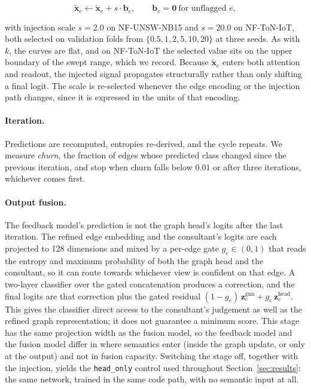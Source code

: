 \begin{equation}
\label{eq:feedback-injection}
\tilde{\mathbf{x}}_{e} \leftarrow \tilde{\mathbf{x}}_{e} + s \cdot \mathbf{b}_{e},
\qquad
\mathbf{b}_{e} = \mathbf{0} \ \text{for unflagged } e ,
\end{equation}

with injection scale $s = 2.0$ on NF-UNSW-NB15 and $s = 20.0$ on NF-ToN-IoT, both selected on
validation folds from $\{0.5, 1, 2, 5, 10, 20\}$ at three seeds. As with $k$, the curves are
flat, and on NF-ToN-IoT the selected value sits on the upper boundary of the swept range,
which we record. Because $\tilde{\mathbf{x}}_{e}$ enters both attention and readout, the
injected signal propagates structurally rather than only shifting a final logit. The scale is
re-selected whenever the edge encoding or the injection path changes, since it is expressed in
the units of that encoding.

\paragraph{Iteration.} Predictions are recomputed, entropies re-derived, and the cycle repeats.
We measure \emph{churn}, the fraction of edges whose predicted class changed since the previous
iteration, and stop when churn falls below $0.01$ or after three iterations, whichever comes
first.

\paragraph{Output fusion.} The feedback model's prediction is not the graph head's logits after the
last iteration. The refined edge embedding and the consultant's logits are each projected to
128 dimensions and mixed by a per-edge gate $g_e \in (0,1)$ that reads the entropy and
maximum probability of both the graph head and the consultant, so it can route towards
whichever view is confident on that edge. A two-layer classifier over the gated concatenation
produces a correction, and the final logits are that correction plus the gated residual
$(1-g_e)\,\mathbf{z}^{\text{gnn}}_e + g_e\,\mathbf{z}^{\text{head}}_e$. This gives the classifier direct access to the consultant's judgement as well as the refined graph representation; it does not guarantee a minimum score. This stage has the same projection width as the fusion model, so the feedback model and the fusion model differ in
where semantics enter (inside the graph update, or only at the output) and not in fusion
capacity. Switching the stage off, together with the injection, yields the \texttt{head\_only}
control used throughout Section~\ref{sec:results}: the same network, trained in the same
code path, with no semantic input at all.

